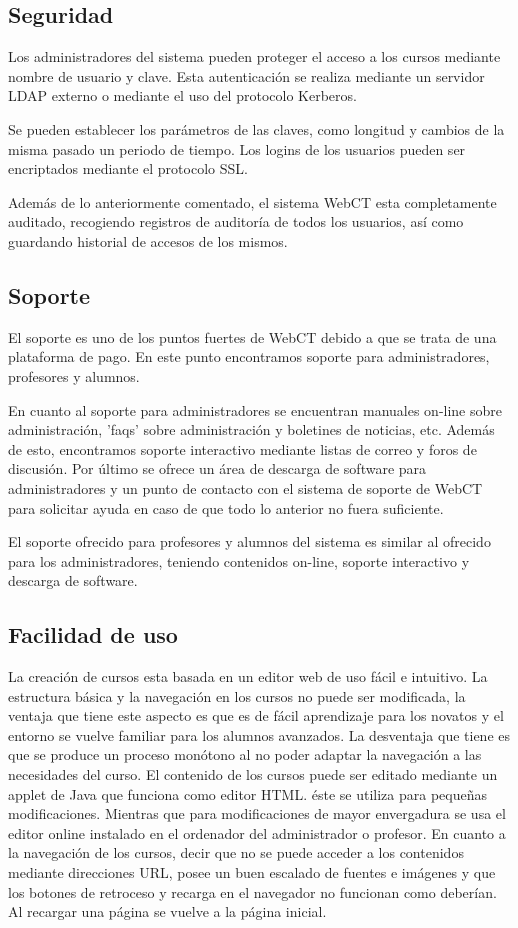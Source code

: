 \subsection{Seguridad}

Los administradores del sistema pueden proteger el acceso a los cursos mediante nombre de usuario y clave. Esta autenticación se realiza mediante un servidor LDAP externo o mediante el uso del protocolo Kerberos.

Se pueden establecer los parámetros de las claves, como longitud y cambios de la misma pasado un periodo de tiempo. Los logins de los usuarios pueden ser encriptados mediante el protocolo SSL.

Además de lo anteriormente comentado, el sistema WebCT esta completamente auditado, recogiendo registros de auditoría de todos los usuarios, así como guardando historial de accesos de los mismos.

\subsection{Soporte}

El soporte es uno de los puntos fuertes de WebCT debido a que se trata de una plataforma de pago. En este punto encontramos soporte para administradores, profesores y alumnos.

En cuanto al soporte para administradores se encuentran manuales on-line sobre administración, 'faqs' sobre administración y boletines de noticias, etc. Además de esto, encontramos soporte interactivo mediante listas de correo y foros de discusión. Por último se ofrece un área de descarga de software para administradores y un punto de contacto con el sistema de soporte de WebCT para solicitar ayuda en caso de que todo lo anterior no fuera suficiente.

El soporte ofrecido para profesores y alumnos del sistema es similar al ofrecido para los administradores, teniendo contenidos on-line, soporte interactivo y descarga de software.

\subsection{Facilidad de uso}

La creación de cursos esta basada en un editor web de uso fácil e intuitivo. La estructura básica y la navegación en los cursos no puede ser modificada, la ventaja que tiene este aspecto es que es de fácil aprendizaje para los novatos y el entorno se vuelve familiar para los alumnos avanzados. La desventaja que tiene es que se produce un proceso monótono al no poder adaptar la navegación a las necesidades del curso. El contenido de los cursos puede ser editado mediante un applet de Java que funciona como editor HTML. éste se utiliza para pequeñas modificaciones. Mientras que para modificaciones de mayor envergadura se usa el editor online instalado en el ordenador del administrador o profesor. En cuanto a la navegación de los cursos, decir que no se puede acceder a los contenidos mediante direcciones URL, posee un buen escalado de fuentes e imágenes y que los botones de retroceso y recarga en el navegador no funcionan como deberían. Al recargar una página se vuelve a la página inicial.

